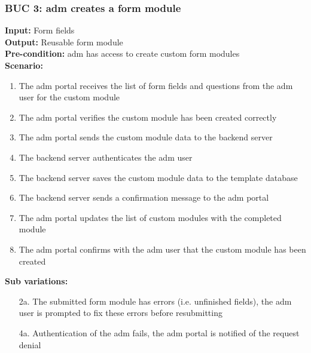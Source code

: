 \documentclass[12pt]{article}
\begin{document}
\subsubsection*{BUC 3: \Gls{adm} creates a form module}
\textbf{Input:} Form fields \\
\textbf{Output:} Reusable form module \\
\textbf{Pre-condition:} \Gls{adm} has access to create custom form modules \\
\textbf{Scenario:}
\begin{enumerate}
  \item The \gls{adm} portal receives the list of form fields and questions from the \gls{adm} user for the custom module
  \item The \gls{adm} portal verifies the custom module has been created correctly
  \item The \gls{adm} portal sends the custom module data to the backend server
  \item The backend server authenticates the \gls{adm} user
  \item The backend server saves the custom module data to the template database
  \item The backend server sends a confirmation message to the \gls{adm} portal
  \item The \gls{adm} portal updates the list of custom modules with the completed module
  \item The \gls{adm} portal confirms with the \gls{adm} user that the custom module has been created
\end{enumerate}
\textbf{Sub variations:}
\begin{itemize}
  \item [2a.] The submitted form module has errors (i.e. unfinished fields), the \gls{adm} user is prompted to fix these errors before resubmitting
  \item [4a.] Authentication of the \gls{adm} fails, the \gls{adm} portal is notified of the request denial
\end{itemize}
\end{document}
